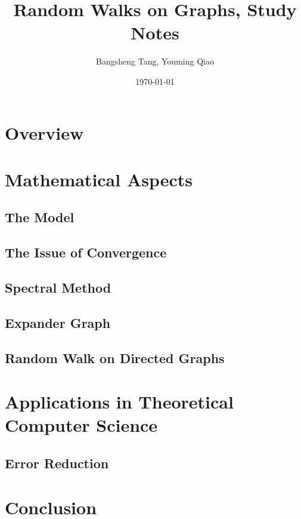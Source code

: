 \documentclass[11pt]{report}
\begin{document}
\title{Random Walks on Graphs, Study Notes}
\author{Bangsheng Tang, Youming Qiao}
\date{\today}
\maketitle \tableofcontents

\chapter{Overview}



\chapter{Mathematical Aspects}

\section{The Model}



\section{The Issue of Convergence}


\section{Spectral Method}


\section{Expander Graph}


\section{Random Walk on Directed Graphs}


\chapter{Applications in Theoretical Computer Science}

\section{Error Reduction}


%

%

%

\chapter{Conclusion}




\end{document}
